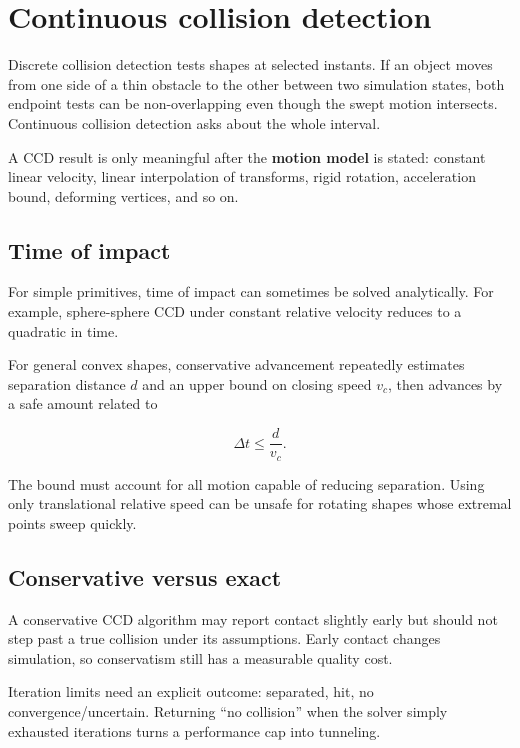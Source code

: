\hypertarget{appendix-66956ed6c753}{}
\section{Continuous collision detection}\label{appendix-66956ed6c753-continuous-collision-detection}

Discrete collision detection tests shapes at selected instants. If an object moves from one side of a thin obstacle to the other between two simulation states, both endpoint tests can be non-overlapping even though the swept motion intersects. Continuous collision detection asks about the whole interval.

A CCD result is only meaningful after the \textbf{motion model} is stated: constant linear velocity, linear interpolation of transforms, rigid rotation, acceleration bound, deforming vertices, and so on.

\subsection{Time of impact}\label{appendix-66956ed6c753-time-of-impact}

For simple primitives, time of impact can sometimes be solved analytically. For example, sphere-sphere CCD under constant relative velocity reduces to a quadratic in time.

For general convex shapes, conservative advancement repeatedly estimates separation distance \(d\) and an upper bound on closing speed \(v_c\), then advances by a safe amount related to

\[
\Delta t\le \frac{d}{v_c}.
\]

The bound must account for all motion capable of reducing separation. Using only translational relative speed can be unsafe for rotating shapes whose extremal points sweep quickly.

\subsection{Conservative versus exact}\label{appendix-66956ed6c753-conservative-versus-exact}

A conservative CCD algorithm may report contact slightly early but should not step past a true collision under its assumptions. Early contact changes simulation, so conservatism still has a measurable quality cost.

Iteration limits need an explicit outcome: separated, hit, no convergence/uncertain. Returning ``no collision'' when the solver simply exhausted iterations turns a performance cap into tunneling.

